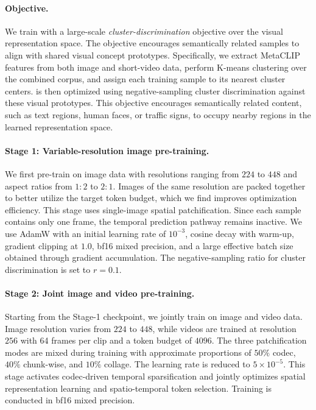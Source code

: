 \paragraph{Objective.} We train \magevit with a large-scale \emph{cluster-discrimination} objective over the visual representation space. The objective encourages semantically related samples to align with shared visual concept prototypes. Specifically, we extract MetaCLIP features from both image and short-video data, perform K-means clustering over the combined corpus, and assign each training sample to its nearest cluster centers. \magevit is then optimized using negative-sampling cluster discrimination against these visual prototypes. This objective encourages semantically related content, such as text regions, human faces, or traffic signs, to occupy nearby regions in the learned representation space.
 

\paragraph{Stage 1: Variable-resolution image pre-training.} 
We first pre-train \magevit on image data with resolutions ranging from $224$ to $448$ and aspect ratios from $1{:}2$ to $2{:}1$. Images of the same resolution are packed together to better utilize the target token budget, which we find improves optimization efficiency. This stage uses single-image spatial patchification. Since each sample contains only one frame, the temporal prediction pathway remains inactive. We use AdamW with an initial learning rate of $10^{-3}$, cosine decay with warm-up, gradient clipping at $1.0$, bf16 mixed precision, and a large effective batch size obtained through gradient accumulation. The negative-sampling ratio for cluster discrimination is set to $r=0.1$.


\paragraph{Stage 2: Joint image and video pre-training.} 
Starting from the Stage-1 checkpoint, we jointly train \magevit on image and video data. Image resolution varies from $224$ to $448$, while videos are trained at resolution $256$ with 64 frames per clip and a token budget of $4096$. The three patchification modes are mixed during training with approximate proportions of $50\%$ codec, $40\%$ chunk-wise, and $10\%$ collage. The learning rate is reduced to $5\times10^{-5}$. This stage activates codec-driven temporal sparsification and jointly optimizes spatial representation learning and spatio-temporal token selection. Training is conducted in bf16 mixed precision.
